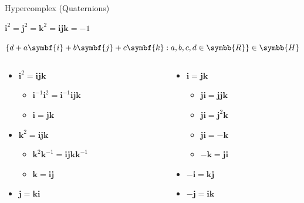 \documentclass[aspectratio=169,t]{beamer}
\begin{document}
\begin{frame}[label={sec:org2d45e06}]{Hypercomplex (Quaternions)}
\begin{definition}[Quaternion]\label{sec:org1be5e62}
\(\symbf{i}^2 = \symbf{j}^2 = \symbf{k}^2 = \symbf{ijk} = -1\)

\(\left\{ d + a\symbf{i} + b\symbf{j} + c\symbf{k} : a,b,c,d \in \symbb{R} \right\} \in \symbb{H}\)
\end{definition}

\begin{columns}
\begin{column}{0.50\columnwidth}
\begin{itemize}[<+->]
\item \(\symbf{i}^2 = \symbf{ijk}\)
\begin{itemize}
\item \(\symbf{i}^{-1} \symbf{i}^2 = \symbf{i}^{-1} \symbf{ijk}\)
\item \(\symbf{i} = \symbf{jk}\)
\end{itemize}
\item \(\symbf{k}^2 = \symbf{ijk}\)
\begin{itemize}
\item \(\symbf{k}^2 \symbf{k}^{-1} = \symbf{ijk} \symbf{k}^{-1}\)
\item \(\symbf{k} = \symbf{ij}\)
\end{itemize}
\item \(\symbf{j} = \symbf{ki}\)
\end{itemize}
\end{column}

\begin{column}{0.50\columnwidth}
\begin{itemize}[<+->]
\item \(\symbf{i} = \symbf{jk}\)
\begin{itemize}
\item \(\symbf{ji} = \symbf{jjk}\)
\item \(\symbf{ji} = \symbf{j}^2 \symbf{k}\)
\item \(\symbf{ji} = -\symbf{k}\)
\item \(-\symbf{k} = \symbf{ji}\)
\end{itemize}
\item \(-\symbf{i} = \symbf{kj}\)
\item \(-\symbf{j} = \symbf{ik}\)
\end{itemize}
\end{column}
\end{columns}
\end{frame}
\end{document}

